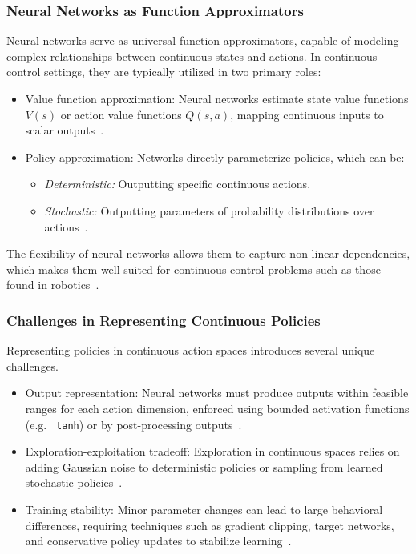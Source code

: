 \subsubsection{Neural Networks as Function Approximators}

Neural networks serve as universal function approximators, capable of modeling complex relationships between continuous states and actions. In continuous control settings, they are typically utilized in two primary roles:
\begin{itemize}
    \item Value function approximation: Neural networks estimate state value functions $V(s)$ or action value functions $Q(s, a)$, mapping continuous inputs to scalar outputs~\cite{gottwald2018neuralvalue}.
    \item Policy approximation: Networks directly parameterize policies, which can be:
    \begin{itemize}
        \item \textit{Deterministic:} Outputting specific continuous actions.
        \item \textit{Stochastic:} Outputting parameters of probability distributions over actions~\cite{gottwald2018neuralvalue}.
    \end{itemize}
\end{itemize}

\noindent The flexibility of neural networks allows them to capture non-linear dependencies, which makes them well suited for continuous control problems such as those found in robotics~\cite{gottwald2018neuralvalue}.

\subsubsection{Challenges in Representing Continuous Policies}

Representing policies in continuous action spaces introduces several unique challenges.
\begin{itemize}
    \item Output representation:  Neural networks must produce outputs within feasible ranges for each action dimension, enforced using bounded activation functions (e.g. \texttt{ tanh}) or by post-processing outputs~\cite{wang2018explorationexploitation}.
    \item Exploration-exploitation tradeoff: Exploration in continuous spaces relies on adding Gaussian noise to deterministic policies or sampling from learned stochastic policies~\cite{wang2018explorationexploitation}.
    \item Training stability: Minor parameter changes can lead to large behavioral differences, requiring techniques such as gradient clipping, target networks, and conservative policy updates to stabilize learning~\cite{shen2024ddpgtd3walker2d}.
\end{itemize}

